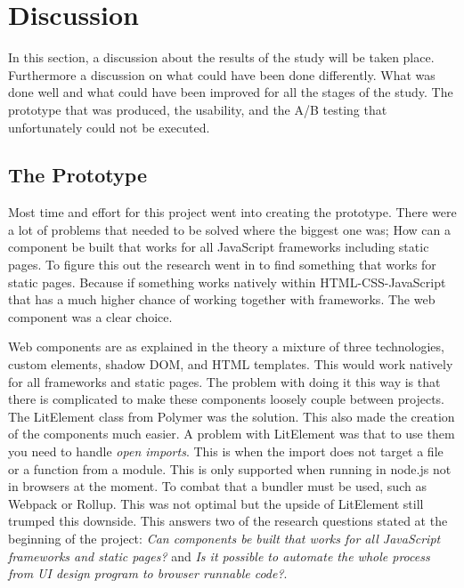 \section{Discussion}

In this section, a discussion about the results of the study will be taken place. Furthermore a discussion on what could have been done differently. What was done well and what could have been improved for all the stages of the study. The prototype that was produced, the usability, and the A/B testing that unfortunately could not be executed.


\subsection{The Prototype}%
\label{sub:The Prototype}
Most time and effort for this project went into creating the prototype. 
There were a lot of problems that needed to be solved where the biggest one was; How can a component be built that works for all JavaScript frameworks including static pages. To figure this out the research went in to find something that works for static pages. Because if something works natively within HTML-CSS-JavaScript that has a much higher chance of working together with frameworks. The web component was a clear choice.

Web components are as explained in the theory a mixture of three technologies, custom elements, shadow DOM, and HTML templates. This would work natively for all frameworks and static pages. The problem with doing it this way is that there is complicated to make these components loosely couple between projects. The LitElement class from Polymer was the solution. This also made the creation of the components much easier. A problem with LitElement was that to use them you need to handle \textit{open imports}. This is when the import does not target a file or a function from a module. This is only supported when running in node.js not in browsers at the moment. To combat that a bundler must be used, such as Webpack or Rollup. This was not optimal but the upside of LitElement still trumped this downside. This answers two of the research questions stated at the beginning of the project: \textit{Can components be built that works for all JavaScript frameworks and static pages?} and \textit{Is it possible to automate the whole process from UI design program to browser runnable code?}.

